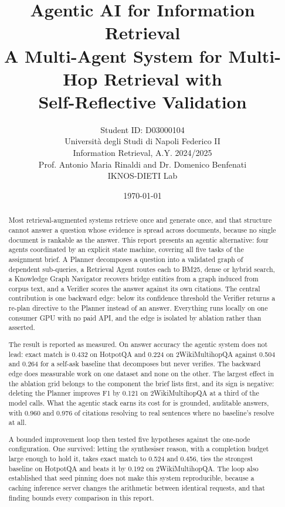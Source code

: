 \documentclass[11pt,a4paper]{report}
\title{%
  \textbf{Agentic AI for Information Retrieval}\\[0.4em]
  \large A Multi-Agent System for Multi-Hop Retrieval with\\
  Self-Reflective Validation
}
\author{%
  Student ID: D03000104\\[0.6em]
  \small Universit\`a degli Studi di Napoli Federico II\\
  \small Information Retrieval, A.Y. 2024/2025\\
  \small Prof. Antonio Maria Rinaldi and Dr. Domenico Benfenati\\
  \small IKNOS-DIETI Lab
}
\date{\today}
\begin{document}
\maketitle
\tableofcontents

\begin{abstract}
Most retrieval-augmented systems retrieve once and generate once, and that
structure cannot answer a question whose evidence is spread across documents,
because no single document is rankable as the answer. This report presents an
agentic alternative: four agents coordinated by an explicit state machine,
covering all five tasks of the assignment brief. A Planner decomposes a
question into a validated graph of dependent sub-queries, a Retrieval Agent
routes each to BM25, dense or hybrid search, a Knowledge Graph Navigator
recovers bridge entities from a graph induced from corpus text, and a Verifier
scores the answer against its own citations. The central contribution is one
backward edge: below its confidence threshold the Verifier returns a re-plan
directive to the Planner instead of an answer. Everything runs locally on one
consumer GPU with no paid API, and the edge is isolated by ablation rather
than asserted.

The result is reported as measured. On answer accuracy the agentic system does
not lead: exact match is 0.432 on HotpotQA and 0.224 on 2WikiMultihopQA against
0.504 and 0.264 for a self-ask baseline that decomposes but never verifies.
The backward edge does measurable work on one dataset and none on the other.
The largest effect in the ablation grid belongs to the component the brief
lists first, and its sign is negative: deleting the Planner improves F1 by
0.121 on 2WikiMultihopQA at a third of the model calls. What the agentic stack
earns its cost for is grounded, auditable answers, with 0.960 and 0.976 of
citations resolving to real sentences where no baseline's resolve at all.

A bounded improvement loop then tested five hypotheses against the one-node
configuration. One survived: letting the synthesiser reason, with a completion
budget large enough to hold it, takes exact match to 0.524 and 0.456, ties the
strongest baseline on HotpotQA and beats it by 0.192 on 2WikiMultihopQA. The
loop also established that seed pinning does not make this system
reproducible, because a caching inference server changes the arithmetic
between identical requests, and that finding bounds every comparison in this
report.
\end{abstract}








{\small

}
\end{document}
